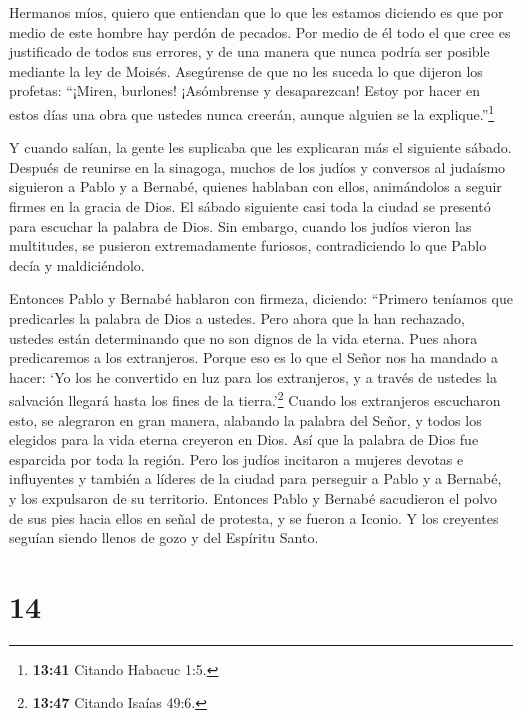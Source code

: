  Hermanos míos, quiero que entiendan que lo que les estamos
diciendo es que por medio de este hombre hay perdón de pecados.
 Por medio de él todo el que cree es justificado de todos
sus errores, y de una manera que nunca podría ser posible mediante la
ley de Moisés.  Asegúrense de que no les suceda lo que
dijeron los profetas:  ``¡Miren, burlones! ¡Asómbrense y
desaparezcan! Estoy por hacer en estos días una obra que ustedes nunca
creerán, aunque alguien se la explique.''\footnote{\textbf{13:41}
  Citando Habacuc 1:5.}

 Y cuando salían, la gente les suplicaba que les explicaran
más el siguiente sábado.  Después de reunirse en la
sinagoga, muchos de los judíos y conversos al judaísmo siguieron a Pablo
y a Bernabé, quienes hablaban con ellos, animándolos a seguir firmes en
la gracia de Dios.  El sábado siguiente casi toda la ciudad
se presentó para escuchar la palabra de Dios.  Sin embargo,
cuando los judíos vieron las multitudes, se pusieron extremadamente
furiosos, contradiciendo lo que Pablo decía y maldiciéndolo.

 Entonces Pablo y Bernabé hablaron con firmeza, diciendo:
``Primero teníamos que predicarles la palabra de Dios a ustedes. Pero
ahora que la han rechazado, ustedes están determinando que no son dignos
de la vida eterna. Pues ahora predicaremos a los extranjeros.
 Porque eso es lo que el Señor nos ha mandado a hacer: `Yo
los he convertido en luz para los extranjeros, y a través de ustedes la
salvación llegará hasta los fines de la tierra.'\footnote{\textbf{13:47}
  Citando Isaías 49:6.}  Cuando los extranjeros escucharon
esto, se alegraron en gran manera, alabando la palabra del Señor, y
todos los elegidos para la vida eterna creyeron en Dios. 
Así que la palabra de Dios fue esparcida por toda la región.
 Pero los judíos incitaron a mujeres devotas e influyentes
y también a líderes de la ciudad para perseguir a Pablo y a Bernabé, y
los expulsaron de su territorio.  Entonces Pablo y Bernabé
sacudieron el polvo de sus pies hacia ellos en señal de protesta, y se
fueron a Iconio.  Y los creyentes seguían siendo llenos de
gozo y del Espíritu Santo.

\hypertarget{section-13}{%
\section{14}\label{section-13}}

